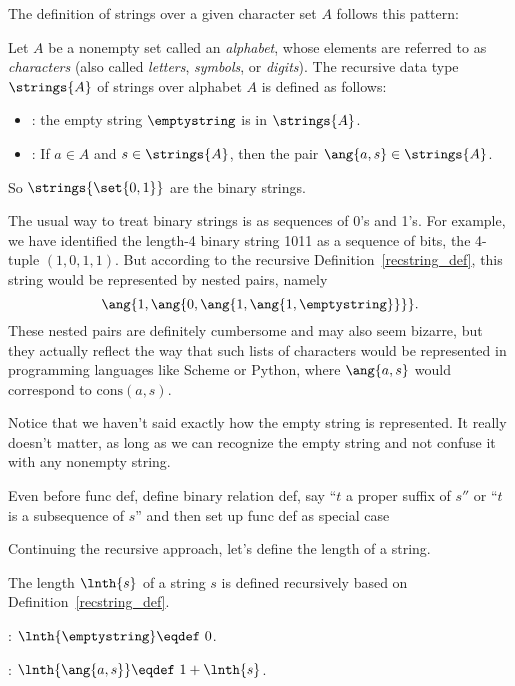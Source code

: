 The definition of strings over a given character set $A$ follows this
pattern:

\begin{definition}\label{recstring_def}
  Let $A$ be a nonempty set called an \emph{alphabet}, whose elements
  are referred to as \emph{characters} (also called \emph{letters},
  \emph{symbols}, or \emph{digits}).  The recursive data type
  $\strings{A}$ of strings over alphabet $A$ is defined as follows:
\begin{itemize}
\item {}: the empty string $\emptystring$ is in $\strings{A}$.

\item {}: If $a \in A$ and $s \in \strings{A}$, then the pair
       $\ang{a,s} \in \strings{A}$.
\end{itemize}
\end{definition}
So $\strings{\set{0,1}}$ are the binary strings.

The usual way to treat binary strings is as sequences of 0's and 1's.
For example, we have identified the length-4 binary string 1011 as a
sequence of bits, the 4-tuple $(1,0,1,1)$.  But according to
the recursive Definition~\ref{recstring_def}, this string would be
represented by nested pairs, namely
\[
\ang{1,\ang{0,\ang{1,\ang{1,\emptystring}}}}.
\]
These nested pairs are definitely cumbersome and may also seem
bizarre, but they actually reflect the way that such lists of
characters would be represented in programming languages like Scheme
or Python, where $\ang{a,s}$ would correspond to $\text{cons}(a, s)$.

Notice that we haven't said exactly how the empty string is
represented.  It really doesn't matter, as long as we can recognize
the empty string and not confuse it with any nonempty string.

\begin{editingnotes}
Even before func def, define binary relation def, say ``$t$ a proper
suffix of $s''$ or ``$t$ is a subsequence of $s$'' and then set up
func def as special case
\end{editingnotes}

Continuing the recursive approach, let's define the length of a string.
\begin{definition}
The length $\lnth{s}$ of a string $s$ is defined recursively based
on Definition~\ref{recstring_def}.

\item {}:  $\lnth{\emptystring} \eqdef\ 0$.

\item {}: $\lnth{\ang{a,s}} \eqdef\ 1 + \lnth{s}$.

\end{definition}


